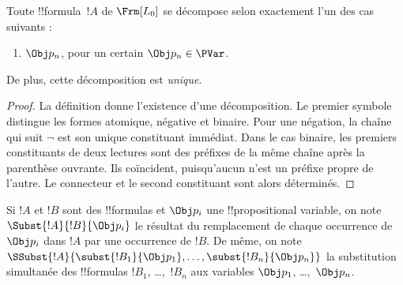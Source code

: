 \documentclass[../../../include/open-logic-section]{subfiles}
\begin{document}
\begin{prop}
Toute !!{formula}~$!A$ de $\Frm[L_0]$ se décompose selon exactement
l'un des cas suivants :
\begin{enumerate}


\item $\Obj p_n$, pour un certain $\Obj p_n \in \PVar$.





\end{enumerate}
De plus, cette décomposition est \emph{unique}.
\end{prop}

\begin{proof}
La définition donne l'existence d'une décomposition. Le premier symbole
distingue les formes atomique, négative et binaire. Pour une négation,
la chaîne qui suit $\lnot$ est son unique constituant immédiat. Dans le
cas binaire, les premiers constituants de deux lectures sont des préfixes
de la même chaîne après la parenthèse ouvrante. Ils coïncident, puisqu'aucun
n'est un préfixe propre de l'autre. Le connecteur et le second constituant sont alors déterminés.
\end{proof}

\begin{defn}
Si $!A$ et $!B$ sont des !!{formula}s et $\Obj p_i$ une
!!{propositional variable}, on note $\Subst{!A}{!B}{\Obj p_i}$ le
résultat du remplacement de chaque occurrence de $\Obj p_i$ dans $!A$
par une occurrence de $!B$. De même, on note
$\SSubst{!A}{\subst{!B_1}{\Obj p_1},\dots,\subst{!B_n}{\Obj p_n}}$
la substitution simultanée des !!{formula}s $!B_1$, \dots,~$!B_n$
aux variables $\Obj p_1$, \dots,~$\Obj p_n$.
\end{defn}
\end{document}
